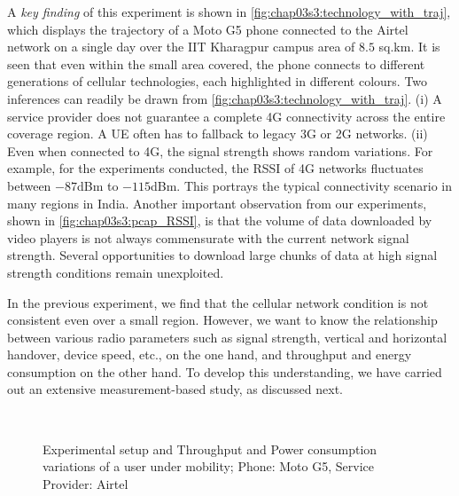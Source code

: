 A \textit{key finding} of this experiment is shown in \fig\ref{fig:chap03s3:technology_with_traj}, which displays the trajectory of a Moto G5 phone connected to the Airtel network on a single day over the IIT Kharagpur campus area of $8.5$ sq.km. It is seen that even within the small area covered, the phone connects to different generations of cellular technologies, each highlighted in different colours. Two inferences can readily be drawn from \fig\ref{fig:chap03s3:technology_with_traj}. (i) A service provider does not guarantee a complete \ac{4G} connectivity across the entire coverage region. A \ac{UE} often has to fallback to legacy \ac{3G} or \ac{2G} networks. (ii) Even when connected to \ac{4G}, the signal strength shows random variations. For example, for the experiments conducted, the \ac{RSSI} of \ac{4G} networks fluctuates between $-87$dBm to $-115$dBm. This portrays the typical connectivity scenario in many regions in India.
Another important observation from our experiments, shown in \fig\ref{fig:chap03s3:pcap_RSSI}, is that the volume of data downloaded by video players is not always commensurate with the current network signal strength. Several opportunities to download large chunks of data at high signal strength conditions remain unexploited.


In the previous experiment, we find that the cellular network condition is not consistent even over a small region. However, we want to know the relationship between various radio parameters such as signal strength, vertical and horizontal handover, device speed, etc., on the one hand, and throughput and energy consumption on the other hand. To develop this understanding, we have carried out an extensive measurement-based study, as discussed next.



\label{sec:chap03s3:EnDASHPilot}
\begin{figure}[!h]
	\captionsetup[subfigure]{width=0.49\linewidth}
	\begin{center}
		\\
	\end{center}
	\caption{Experimental setup and Throughput and Power consumption variations of a user under mobility; Phone: Moto G5, Service Provider: Airtel}
\end{figure}

